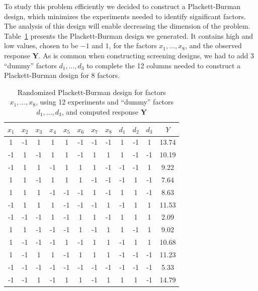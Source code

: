 \documentclass[conference]{IEEEtran}
\begin{document}
To study this problem efficiently we decided to construct a Plackett-Burman
design, which minimizes the experiments needed to identify significant factors. The
analysis of this design will enable decreasing the dimension of the problem.
Table~\ref{tab:plackett} presents the Plackett-Burman design we generated.
It contains high and low values, chosen to be \(-1\) and \(1\), for the factors
\(x_1,\dots,x_8\), and the observed response \(\mathbf{Y}\). As is common when
constructing screening designs, we had to add 3 ``dummy'' factors
\(d_1,\dots,d_3\) to complete the 12 columns needed to construct a Plackett-Burman
design for 8 factors.

\begin{table}[b]
\centering
\caption{Randomized Plackett-Burman design for factors $x_1, \dots, x_8$, using 12 experiments and ``dummy'' factors $d_1, \dots, d_3$, and computed response $\mathbf{Y}$}
\label{tab:plackett}
\begingroup\scriptsize
\begin{tabular}{cccccccccccc}
  \toprule
$x_1$ & $x_2$ & $x_3$ & $x_4$ & $x_5$ & $x_6$ & $x_7$ & $x_8$ & $d_1$ & $d_2$ & $d_3$ & $Y$ \\
  \midrule
1 & -1 & 1 & 1 & 1 & -1 & -1 & -1 & 1 & -1 & 1 & 13.74 \\
  -1 & 1 & -1 & 1 & 1 & -1 & 1 & 1 & 1 & -1 & -1 & 10.19 \\
  -1 & 1 & 1 & -1 & 1 & 1 & 1 & -1 & -1 & -1 & 1 & 9.22 \\
  1 & 1 & -1 & 1 & 1 & 1 & -1 & -1 & -1 & 1 & -1 & 7.64 \\
  1 & 1 & 1 & -1 & -1 & -1 & 1 & -1 & 1 & 1 & -1 & 8.63 \\
  -1 & 1 & 1 & 1 & -1 & -1 & -1 & 1 & -1 & 1 & 1 & 11.53 \\
  -1 & -1 & -1 & 1 & -1 & 1 & 1 & -1 & 1 & 1 & 1 & 2.09 \\
  1 & 1 & -1 & -1 & -1 & 1 & -1 & 1 & 1 & -1 & 1 & 9.02 \\
  1 & -1 & -1 & -1 & 1 & -1 & 1 & 1 & -1 & 1 & 1 & 10.68 \\
  1 & -1 & 1 & 1 & -1 & 1 & 1 & 1 & -1 & -1 & -1 & 11.23 \\
  -1 & -1 & -1 & -1 & -1 & -1 & -1 & -1 & -1 & -1 & -1 & 5.33 \\
  -1 & -1 & 1 & -1 & 1 & 1 & -1 & 1 & 1 & 1 & -1 & 14.79 \\
   \bottomrule
\end{tabular}
\endgroup
\end{table}
\end{document}
